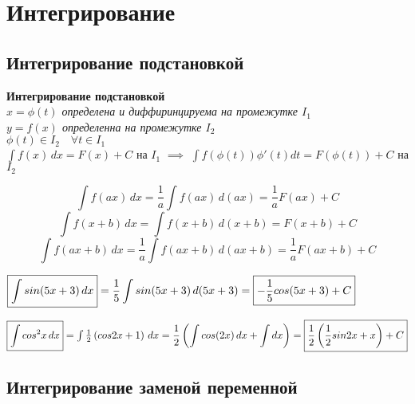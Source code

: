 \section{Интегрирование}

\subsection{Интегрирование подстановкой}

\begin{theorem}
\textbf{Интегрирование подстановкой} \\
\textit{
  $x = \phi(t)$ определена и диффиринцируема на промежутке $I_1$ \\
  $y = f(x)$ определенна на промежутке $I_2$ \\
  $\phi(t) \in I_2 \quad \forall t \in I_1$
} \\
$\displaystyle\int f(x)\,dx = F(x) + C$ на $I_1$ $\implies$ $\displaystyle\int f(\phi(t))\phi'(t)dt = F(\phi(t)) + C$ на $I_2$
\end{theorem}
\begin{corollary}
$$\int f(ax)\,dx = \frac{1}{a}\int f(ax)\,d(ax) = \frac{1}{a}F(ax) + C$$
$$\int f(x + b)\,dx = \int f(x + b)\,d(x + b) = F(x + b) + C$$
$$\int f(ax + b)\,dx = \frac{1}{a}\int f(ax + b)\,d(ax + b) = \frac{1}{a}F(ax + b) + C$$
\end{corollary}

\begin{eg}
$\fbox{$\displaystyle\int sin(5x + 3)\,dx$} = \displaystyle\frac{1}{5}\int sin(5x + 3)\,d(5x + 3) = \fbox{$-\displaystyle\frac{1}{5}cos(5x + 3) + C$}$
\end{eg}

\begin{eg}
$\fbox{$\displaystyle\int cos^2x\,dx$} = \int \frac{1}{2}\left(cos2x + 1\right)\,dx = \displaystyle\frac{1}{2}\left(\int cos(2x)\,dx + \int dx\right) = \fbox{$\displaystyle\frac{1}{2}\left(\frac{1}{2}sin2x + x\right) + C$}$
\end{eg}

\subsection{Интегрирование заменой переменной}

